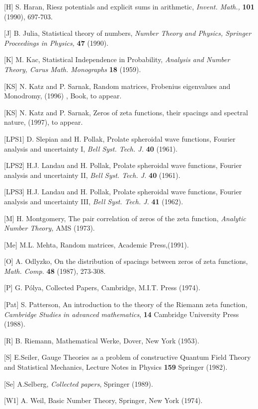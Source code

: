\item{[H]} S. Haran, Riesz potentials and explicit sums in
arithmetic, {\it Invent. Math.,} {\bf 101} (1990), 697-703.
\item{[J]} B. Julia, Statistical theory of numbers, {\it Number Theory 
and Physics, Springer Proceedings in Physics,} {\bf 47} (1990).
\item{[K]} M. Kac, Statistical Independence in Probability, {\it 
Analysis and Number Theory, Carus Math. Monographs } {\bf 18} (1959).
\item{[KS]} N. Katz and P. Sarnak, Random matrices, Frobenius 
eigenvalues and Monodromy, (1996) , Book, to appear.
\item{[KS]} N. Katz and P. Sarnak, Zeros of zeta functions, their 
spacings and spectral nature, (1997), to appear.
\item{[LPS1]} D. Slepian and H. Pollak, Prolate spheroidal wave 
functions, Fourier analysis and uncertainty I, {\it Bell Syst. Tech. J.} 
{\bf 40} (1961).
\item{[LPS2]} H.J. Landau and H. Pollak, Prolate spheroidal wave 
functions, Fourier analysis and uncertainty II, {\it Bell Syst. Tech. 
J.} {\bf 40} (1961).
\item{[LPS3]} H.J. Landau and H. Pollak, Prolate spheroidal wave 
functions, Fourier analysis and uncertainty III, {\it Bell Syst. Tech. 
J.} {\bf 41} (1962).
\item{[M]} H. Montgomery, The pair correlation of zeros of
the zeta function, {\it Analytic Number Theory,} AMS (1973).
\item{[Me]} M.L. Mehta, Random matrices, Academic Press,(1991).
\item {[O]} A. Odlyzko, On the distribution of spacings between zeros of 
zeta functions, {\it Math. Comp.} {\bf 48} (1987), 273-308.  
\item {[P]} G. P\'olya, Collected Papers, Cambridge, M.I.T. Press 
(1974).
\item{[Pat]} S. Patterson, An introduction to the theory of the Riemann 
zeta
function, {\it Cambridge Studies in advanced mathematics}, {\bf 14}
Cambridge University Press (1988).
\item{[R]} B. Riemann, Mathematical Werke, Dover, New York (1953). 
\item{[S]} E.Seiler, Gauge Theories as a problem of constructive Quantum 
Field Theory and Statistical Mechanics, Lecture Notes in Physics {\bf 
159}
 Springer (1982).
\item{[Se]} A.Selberg, {\it Collected papers},
 Springer (1989).
\item{[W1]} A. Weil, Basic Number Theory, Springer, New
York (1974).

